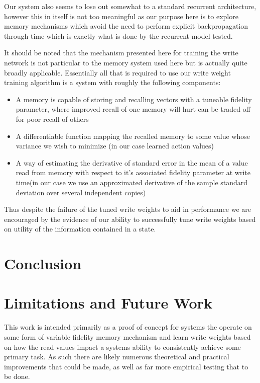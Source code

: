 \documentclass{article}
\begin{document}
Our system also seems to lose out somewhat to a standard recurrent architecture, however this in itself is not too meaningful as our purpose here is to explore memory mechanisms which avoid the need to perform explicit backpropagation through time which is exactly what is done by the recurrent model tested.

It should be noted that the mechanism presented here for training the write network is not particular to the memory system used here but is actually quite broadly applicable. Essentially all that is required to use our write weight training algorithm is a system with roughly the following components:
\begin{itemize}
\item A memory is capable of storing and recalling vectors with a tuneable fidelity parameter, where improved recall of one memory will hurt can be traded off for poor recall of others
\item A differentiable function mapping the recalled memory to some value whose variance we wish to minimize (in our case learned action values)
\item A way of estimating the derivative of standard error in the mean of a value read from memory with respect to it's associated fidelity parameter at write time(in our case we use an approximated derivative of the sample standard deviation over several independent copies)
\end{itemize}
Thus despite the failure of the tuned write weights to aid in performance we are encouraged by the evidence of our ability to successfully tune write weights based on utility of the information contained in a state.

\section*{Conclusion}

\section*{Limitations and Future Work}
This work is intended primarily as a proof of concept for systems the operate on some form of variable fidelity memory mechanism and learn write weights based on how the read values impact a systems ability to consistently achieve some primary task. As such there are likely numerous theoretical and practical improvements that could be made, as well as far more empirical testing that to be done. 
\end{document}
